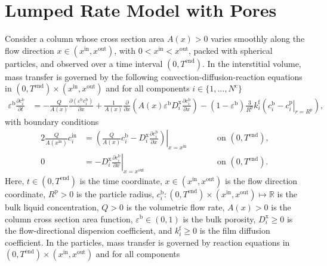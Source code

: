 \documentclass{article}
\begin{document}
\section*{Lumped Rate Model with Pores}
Consider a column whose cross section area $A(x) > 0$ varies smoothly along the flow direction $x \in (x^{\mathrm{in}}, x^{\mathrm{out}})$, with $0 < x^{\mathrm{in}} < x^{\mathrm{out}}$, packed with spherical particles, and observed over a time interval $(0, T^{\mathrm{end}})$.
In the interstitial volume, mass transfer is governed by the following convection-diffusion-reaction equations in $(0, T^{\mathrm{end}})\times (x^{\mathrm{in}}, x^{\mathrm{out}})$ and for all components $i\in\{1, \dots, N^{\mathrm{c}} \}$
\begin{align}
    \varepsilon^{\mathrm{b}} \frac{\partial c^{\mathrm{b}}_{i}}{\partial t}
    &= - \frac{Q}{A(x)} \frac{\partial \left( \varepsilon^{\mathrm{b}} c^{\mathrm{b}}_{i} \right)}{\partial x}
        + \frac{1}{A(x)} \frac{\partial}{\partial x} \left( A(x) \varepsilon^{\mathrm{b}} D^{\mathrm{x}}_{i} \frac{\partial c^{\mathrm{b}}_{i}}{\partial x} \right)
        - \left(1 - \varepsilon^{\mathrm{b}} \right) \frac{3}{R^{\mathrm{p}}} k^{\mathrm{f}}_{i} \left(c^{\mathrm{b}}_{i} - \left. c^{\mathrm{p}}_{i} \right|_{r = R^{\mathrm{p}}} \right),
\end{align}
with boundary conditions
\begin{alignat}{2}
    \frac{Q}{A(x^{\mathrm{in}})} c^{\mathrm{in}}_{i}
    &= \left.\left( \frac{Q}{A(x)} c^{\mathrm{b}}_{i} - D^{\mathrm{x}}_{i} \frac{\partial c^{\mathrm{b}}_{i}}{\partial x}\right)\right|_{x=x^{\mathrm{in}}}
    & & \qquad\text{on }(0, T^{\mathrm{end}}),
    \\
    0
    &= - D^{\mathrm{x}}_{i} \left. \frac{\partial c^{\mathrm{b}}_{i}}{\partial x} \right|_{x=x^{\mathrm{out}}}
    & & \qquad\text{on }(0, T^{\mathrm{end}}).
\end{alignat}
Here, $t\in (0, T^{\mathrm{end}})$ is the time coordinate, $x\in (x^{\mathrm{in}}, x^{\mathrm{out}})$ is the flow direction coordinate, $R^{\mathrm{p}}> 0$ is the particle radius, $c^{\mathrm{b}}_{i}\colon (0, T^{\mathrm{end}})\times (x^{\mathrm{in}}, x^{\mathrm{out}}) \mapsto \mathbb{R}$ is the bulk liquid concentration, $Q> 0$ is the volumetric flow rate, $A(x) > 0$ is the column cross section area function, $\varepsilon^{\mathrm{b}}\in (0, 1)$ is the bulk porosity, $D^{\mathrm{x}}_{i}\geq 0$ is the flow-directional dispersion coefficient, and $k^{\mathrm{f}}_{i}\geq 0$ is the film diffusion coefficient.
In the particles, mass transfer is governed by reaction equations in $(0, T^{\mathrm{end}}) \times (x^{\mathrm{in}}, x^{\mathrm{out}})$ and for all components
\end{document}
